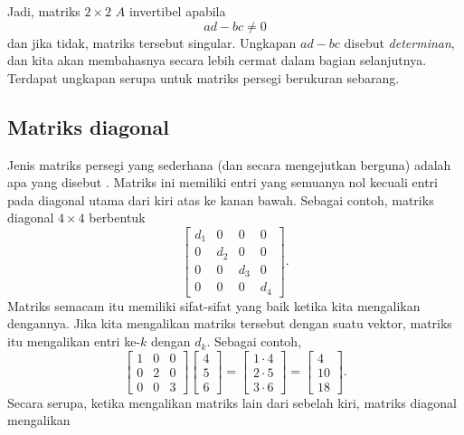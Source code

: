 Jadi, matriks $2 \times 2$ $A$ invertibel apabila
\begin{equation*}
ad - bc \neq 0
\end{equation*}
dan jika tidak, matriks tersebut singular. Ungkapan $ad-bc$ disebut
\emph{determinan}, dan kita akan membahasnya
secara lebih cermat dalam bagian selanjutnya.
Terdapat ungkapan serupa untuk matriks persegi
berukuran sebarang.

\subsection{Matriks diagonal}

Jenis matriks persegi yang sederhana (dan secara mengejutkan berguna) adalah apa yang disebut
\emph{}. Matriks ini memiliki entri yang semuanya nol
kecuali entri pada diagonal utama dari kiri atas ke kanan bawah. Sebagai
contoh, matriks diagonal $4 \times 4$ berbentuk
\begin{equation*}
\begin{bmatrix}
d_1 & 0 & 0 & 0 \\
0 & d_2 & 0 & 0 \\
0 & 0 & d_3 & 0 \\
0 & 0 & 0 & d_4
\end{bmatrix} .
\end{equation*}
Matriks semacam itu memiliki sifat-sifat yang baik ketika kita mengalikan dengannya. Jika kita mengalikan
matriks tersebut dengan suatu vektor, matriks itu mengalikan entri ke-$k$ dengan $d_k$. Sebagai
contoh,
\begin{equation*}
\begin{bmatrix}
1 & 0 & 0 \\
0 & 2 & 0 \\
0 & 0 & 3
\end{bmatrix}
\begin{bmatrix}
4 \\ 5 \\ 6
\end{bmatrix}
=
\begin{bmatrix}
1 \cdot 4 \\ 2 \cdot 5 \\ 3 \cdot 6
\end{bmatrix}
=
\begin{bmatrix}
4 \\ 10 \\ 18
\end{bmatrix} .
\end{equation*}
Secara serupa, ketika mengalikan matriks lain dari sebelah kiri, matriks diagonal mengalikan

